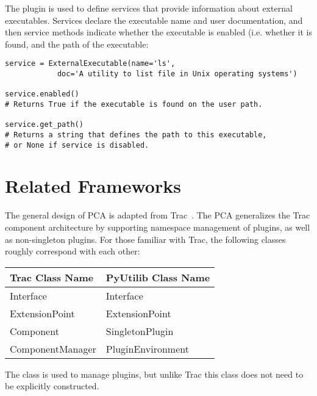 The  plugin is used to define services that provide
information about external executables. Services declare the executable
name and user documentation, and then service methods indicate whether
the executable is enabled (i.e. whether it is found, and the path of
the executable:
\begin{lstlisting}
service = ExternalExecutable(name='ls', 
            doc='A utility to list file in Unix operating systems')

service.enabled()     
# Returns True if the executable is found on the user path.

service.get_path()
# Returns a string that defines the path to this executable, 
# or None if service is disabled.
\end{lstlisting}


\section{Related Frameworks}

The general design of PCA is adapted from Trac~\cite{Trac}. The PCA
generalizes the Trac component architecture by supporting namespace
management of plugins, as well as non-singleton plugins. For those
familiar with Trac, the following classes roughly correspond with
each other:
\begin{table}
\begin{center}
\begin{tabular}{|l|l|} \hline
    Trac Class Name &	PyUtilib Class Name \\ \hline
    Interface 	& Interface \\
    ExtensionPoint 	& ExtensionPoint \\
    Component 	& SingletonPlugin \\
    ComponentManager 	& PluginEnvironment \\ \hline
\end{tabular}
\end{center}
\end{table}
The  class is used to manage plugins, but unlike Trac this class does not need to be explicitly constructed. 


